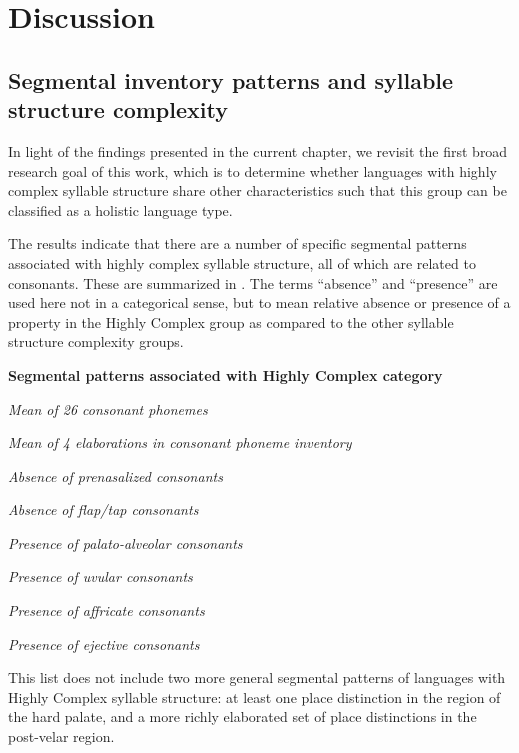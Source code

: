 \section{Discussion}\label{sec:4.5}
\subsection{Segmental inventory patterns and syllable structure complexity}\label{sec:4.5.1}

  In light of the findings presented in the current chapter, we revisit the first broad research goal of this work, which is to determine whether languages with highly complex syllable structure share other characteristics such that this group can be classified as a holistic language type.

  The results indicate that there are a number of specific segmental patterns associated with highly complex syllable structure, all of which are related to consonants. These are summarized in . The terms ``absence'' and ``presence'' are used here not in a categorical sense, but to mean relative absence or presence of a property in the Highly Complex group as compared to the other syllable structure complexity groups.

\ea\label{ex:4.34}
  \textbf{Segmental patterns associated with Highly Complex category}

\textit{Mean of 26 consonant phonemes}

\textit{Mean of 4 elaborations in consonant phoneme inventory}

\textit{Absence of prenasalized consonants}

\textit{Absence of flap/tap consonants}

\textit{Presence of palato-alveolar consonants}

\textit{Presence of uvular consonants}

\textit{Presence of affricate consonants} 

\textit{Presence of ejective consonants}
\z

  This list does not include two more general segmental patterns of languages with Highly Complex syllable structure: at least one place distinction in the region of the hard palate, and a more richly elaborated set of place distinctions in the post-velar region.

